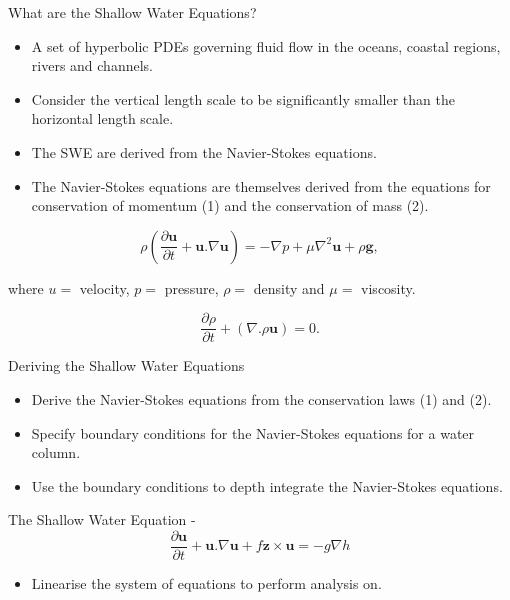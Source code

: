 \documentclass[12pt]{beamer}
\begin{document}
\begin{frame}{What are the Shallow Water Equations?}
	
    \begin{itemize}
    	\item A set of hyperbolic PDEs governing fluid flow in the oceans, coastal regions, rivers and channels.
        \item Consider the vertical length scale to be significantly smaller than the horizontal length scale.
        \item The SWE are derived from the Navier-Stokes equations.
		\item The Navier-Stokes equations are themselves derived from the equations for conservation of momentum (1) and the conservation of mass (2).
        \end{itemize}
        
    \vspace{-15pt}
        
 	\begin{equation}   
    	\rho(\frac{\partial{\textbf{u}}}{\partial{t}} + \textbf{u}.\nabla \textbf{u}) = -\nabla p  + \mu \nabla^2\textbf{u} + \rho \textbf{g},
    \end{equation}
 
 where $u=$ velocity, $p=$ pressure, $\rho=$ density and $\mu=$ viscosity.
 
 	\begin{equation}
     	\frac{\partial{\rho}}{\partial{t}} + (\nabla.\rho \textbf{u}) = 0.
    \end{equation}
 
\end{frame}


\begin{frame}{Deriving the Shallow Water Equations}

	\begin{itemize}
		\item Derive the Navier-Stokes equations from the conservation laws (1) and (2).
		\item Specify boundary conditions for the Navier-Stokes equations for a water column.
		\item Use the boundary conditions to depth integrate the Navier-Stokes equations.
    \end{itemize}
    
The Shallow Water Equation -
	\begin{equation}
    	\frac{\partial{\textbf{u}}}{\partial{t}} + \textbf{u}.\nabla\textbf{u} + f \textbf{z} \times \textbf{u} = -g \nabla h
    \end{equation}
    
	\begin{itemize}
		\item Linearise the system of equations to perform analysis on.
    \end{itemize}
    
\end{frame}
\end{document}
